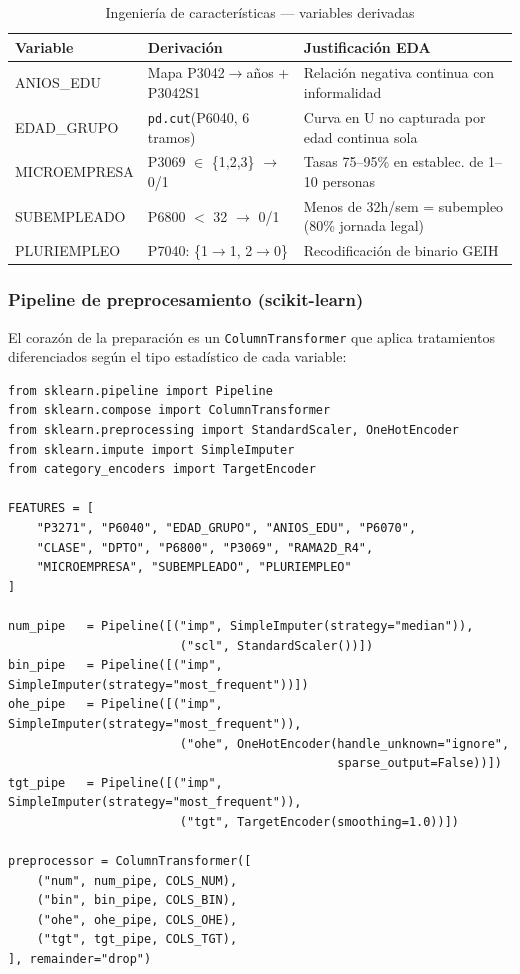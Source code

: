 \documentclass[12pt, a4paper]{article}
\begin{document}
\begin{table}[H]
\centering
\caption{Ingeniería de características — variables derivadas}
\label{tab:features_eng}
\begin{tabularx}{\textwidth}{llX}
\toprule
\textbf{Variable} & \textbf{Derivación} & \textbf{Justificación EDA} \\
\midrule
ANIOS\_EDU & Mapa P3042$\to$años + P3042S1 & Relación negativa continua con informalidad \\
EDAD\_GRUPO & \texttt{pd.cut}(P6040, 6 tramos) & Curva en U no capturada por edad continua sola \\
MICROEMPRESA & P3069 $\in$ \{1,2,3\} $\to$ 0/1 & Tasas 75--95\% en establec. de 1--10 personas \\
SUBEMPLEADO & P6800 $<$ 32 $\to$ 0/1 & Menos de 32h/sem = subempleo (80\% jornada legal) \\
PLURIEMPLEO & P7040: \{1$\to$1, 2$\to$0\} & Recodificación de binario GEIH \\
\bottomrule
\end{tabularx}
\end{table}

\subsubsection{Pipeline de preprocesamiento (scikit-learn)}

El corazón de la preparación es un \texttt{ColumnTransformer} que aplica tratamientos
diferenciados según el tipo estadístico de cada variable:

\begin{lstlisting}[caption={Pipeline ColumnTransformer — extracto de 3.Preparacion.ipynb}]
from sklearn.pipeline import Pipeline
from sklearn.compose import ColumnTransformer
from sklearn.preprocessing import StandardScaler, OneHotEncoder
from sklearn.impute import SimpleImputer
from category_encoders import TargetEncoder

FEATURES = [
    "P3271", "P6040", "EDAD_GRUPO", "ANIOS_EDU", "P6070",
    "CLASE", "DPTO", "P6800", "P3069", "RAMA2D_R4",
    "MICROEMPRESA", "SUBEMPLEADO", "PLURIEMPLEO"
]

num_pipe   = Pipeline([("imp", SimpleImputer(strategy="median")),
                        ("scl", StandardScaler())])
bin_pipe   = Pipeline([("imp", SimpleImputer(strategy="most_frequent"))])
ohe_pipe   = Pipeline([("imp", SimpleImputer(strategy="most_frequent")),
                        ("ohe", OneHotEncoder(handle_unknown="ignore",
                                              sparse_output=False))])
tgt_pipe   = Pipeline([("imp", SimpleImputer(strategy="most_frequent")),
                        ("tgt", TargetEncoder(smoothing=1.0))])

preprocessor = ColumnTransformer([
    ("num", num_pipe, COLS_NUM),
    ("bin", bin_pipe, COLS_BIN),
    ("ohe", ohe_pipe, COLS_OHE),
    ("tgt", tgt_pipe, COLS_TGT),
], remainder="drop")
\end{lstlisting}
\end{document}
